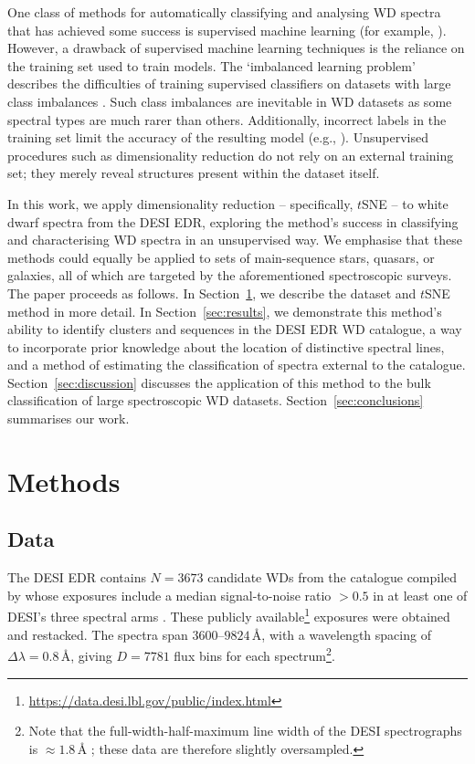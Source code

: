 \documentclass[fleqn,usenatbib]{mnras}
\begin{document}
One class of methods for automatically classifying and analysing WD spectra that has achieved some success is supervised machine learning (for example, \citealt{yang20, tan23, garciazamora23, vincent23, vincent24}).
However, a drawback of supervised machine learning techniques is the reliance on the training set used to train models.
The `imbalanced learning problem' describes the difficulties of training supervised classifiers on datasets with large class imbalances \citep{he09, johnson19}.
Such class imbalances are inevitable in WD datasets as some spectral types are much rarer than others.
Additionally, incorrect labels in the training set limit the accuracy of the resulting model (e.g., \citealt{frenay14}).
Unsupervised procedures such as dimensionality reduction do not rely on an external training set; they merely reveal structures present within the dataset itself.

In this work, we apply dimensionality reduction -- specifically, $t$SNE -- to white dwarf spectra from the DESI EDR, exploring the method's success in classifying and characterising WD spectra in an unsupervised way.
We emphasise that these methods could equally be applied to sets of main-sequence stars, quasars, or galaxies, all of which are targeted by the aforementioned spectroscopic surveys.
The paper proceeds as follows.
In Section~\ref{sec:methods}, we describe the dataset and $t$SNE method in more detail.
In Section~\ref{sec:results}, we demonstrate this method's ability to identify clusters and sequences in the DESI EDR WD catalogue, a way to incorporate prior knowledge about the location of distinctive spectral lines, and a method of estimating the classification of spectra external to the catalogue.
Section~\ref{sec:discussion} discusses the application of this method to the bulk classification of large spectroscopic WD datasets.
Section~\ref{sec:conclusions} summarises our work.

\section{Methods}
\label{sec:methods}

\subsection{Data}

The DESI EDR contains $N=3673$ candidate WDs from the catalogue compiled by \citet{gentilefusillo19} whose exposures include a median signal-to-noise ratio $>0.5$ in at least one of DESI's three spectral arms \citep{manser24}.
These publicly available\footnote{
    \url{https://data.desi.lbl.gov/public/index.html}
} exposures were obtained and restacked.
The spectra span $3600$--$9824\,\text{\AA}$, with a wavelength spacing of $\Delta \lambda = 0.8\,\text{\AA}$, giving $D=7781$ flux bins for each spectrum\footnote{
    Note that the full-width-half-maximum line width of the DESI spectrographs is $\approx1.8\,\text{\AA}$ \citep{abareshi22}; these data are therefore slightly oversampled.
}.
\end{document}

